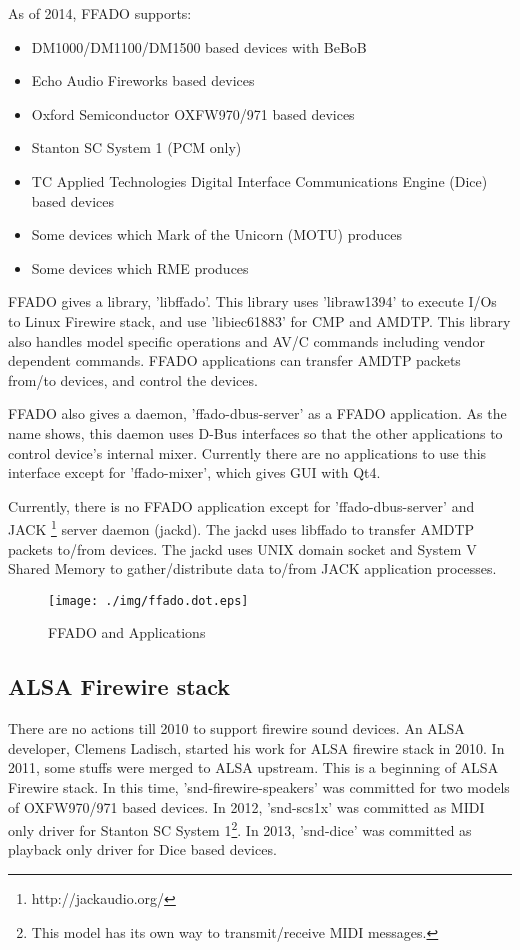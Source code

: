 \documentclass[onecolumn]{article}
\begin{document}
As of 2014, FFADO supports:
\begin{itemize}
\item DM1000/DM1100/DM1500 based devices with BeBoB
\item Echo Audio Fireworks based devices
\item Oxford Semiconductor OXFW970/971 based devices
\item Stanton SC System 1 (PCM only)
\item TC Applied Technologies Digital Interface Communications Engine (Dice) based devices 
\item Some devices which Mark of the Unicorn (MOTU) produces
\item Some devices which RME produces
\end{itemize}

FFADO gives a library, 'libffado'. This library uses 'libraw1394' to execute I/Os to Linux Firewire stack, and use 'libiec61883' for CMP and AMDTP. This library also handles model specific operations and AV/C commands including vendor dependent commands. FFADO applications can transfer AMDTP packets from/to devices, and control the devices.

FFADO also gives a daemon, 'ffado-dbus-server' as a FFADO application. As the name shows, this daemon uses D-Bus interfaces so that the other applications to control device's internal mixer. Currently there are no applications to use this interface except for 'ffado-mixer', which gives GUI with Qt4.

Currently, there is no FFADO application except for 'ffado-dbus-server' and JACK \footnote{http://jackaudio.org/} server daemon (jackd). The jackd uses libffado to transfer AMDTP packets to/from devices. The jackd uses UNIX domain socket and System V Shared Memory to gather/distribute data to/from JACK application processes. 

\begin{figure}[H]
	\centering
	\texttt{[image: ./img/ffado.dot.eps]}
	\caption{{FFADO and Applications}}
	\label{ffado_apps}
\end{figure}


\subsection{ALSA Firewire stack}
There are no actions till 2010 to support firewire sound devices. An ALSA developer, Clemens Ladisch, started his work for ALSA firewire stack in 2010. In 2011, some stuffs were merged to ALSA upstream. This is a beginning of ALSA Firewire stack. In this time, 'snd-firewire-speakers' was committed for two models of OXFW970/971 based devices. In 2012, 'snd-scs1x' was committed as MIDI only driver for Stanton SC System 1\footnote{This model has its own way to transmit/receive MIDI messages.}. In 2013, 'snd-dice' was committed as playback only driver for Dice based devices.
\end{document}
